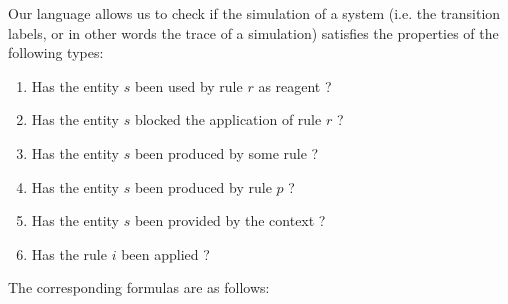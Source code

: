 Our  language allows us to check if the simulation of a system (i.e. the transition labels, or in other words the trace of a simulation) 
satisfies the properties of the following types:%
\begin{enumerate}
\item Has the entity $s$ been used by rule $r$  as reagent ?
\item Has the entity $s$ blocked the application of  rule $r$ ?
\item Has the entity $s$ been produced by some rule ?
\item Has the entity $s$ been produced by rule $p$ ?
\item Has the entity $s$ been provided by the context ? 
\item Has the rule $i$ been applied ? 
\end{enumerate}
The corresponding formulas are as follows:\\

